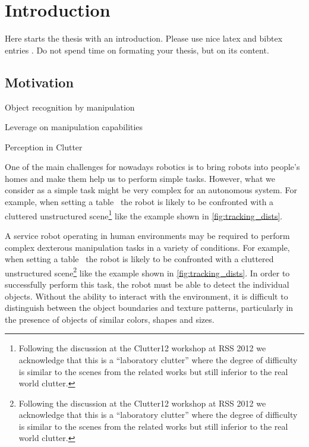 \chapter{Introduction}
\label{chapter:Introduction}



Here starts the thesis with an introduction. Please use nice latex and bibtex entries \cite{latex}. Do not spend time on formating your thesis, but on its content. 
 
\section{Motivation}
\itemize 
\item Object recognition by manipulation
\item Leverage on manipulation capabilities
\item Perception in Clutter

\label{sec:intro}
One of the main challenges for nowadays robotics is to bring robots into people's homes and make them help us to perform simple tasks. However, what we consider as a simple task might be very complex for an autonomous system. For example, when setting a table~\cite{iros10kcopman} the robot is likely to be
confronted with a cluttered unstructured scene\footnote{Following the discussion at the Clutter12
workshop at RSS 2012 we acknowledge that this is a ``laboratory clutter'' where the degree of difficulty
is similar to the scenes from the related works but still inferior to the real world clutter.} like the example shown
in \ref{fig:tracking_dists}.















A service robot operating in human environments may be
required to perform complex  dexterous manipulation tasks in a variety
of  conditions.  For example, when setting a table~\cite{iros10kcopman} the robot is likely to be
confronted with a cluttered unstructured scene\footnote{Following the discussion at the Clutter12
workshop at RSS 2012 we acknowledge that this is a ``laboratory clutter'' where the degree of difficulty
is similar to the scenes from the related works but still inferior to the real world clutter.} like the example shown
in \ref{fig:tracking_dists}.  In order to successfully perform this task,
the robot must be able  to detect the individual objects.  Without the
ability  to interact  with the  environment,  it is  difficult  to
distinguish between the object boundaries and texture patterns, particularly in the presence of objects of similar colors, shapes and sizes. 

